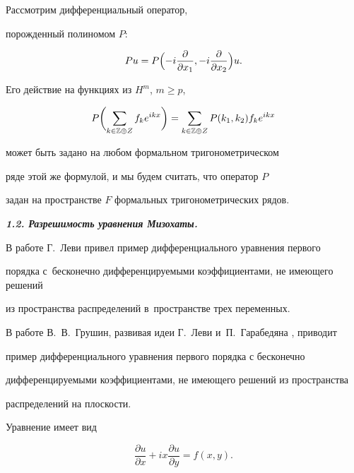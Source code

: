 Рассмотрим дифференциальный оператор,


порожденный полиномом $P$:

$$

P u = P \Bigl ( - i \frac

{\partial}{\partial x_1}, - i \frac {\partial}{\partial x_2} \Bigr ) u.

$$

Его  действие  на  функциях из  $H^m$, $ m\ge p$,  

$$ P\biggl(\sum_{k \in {\Bbb Z\oplus Z}} f_k e^{i k x}\biggr)=\sum_{k \in {\Bbb Z\oplus Z}} P(k_1,k_2)f_k e^{i k x}$$

может быть задано на любом формальном тригонометрическом

ряде этой же формулой, и мы будем считать, что оператор $P$

задан на пространстве $F$ формальных тригонометрических рядов.







\smallskip



{\bf \itshape 1.2. Разрешимость уравнения Мизохаты.}

В работе \cite{bur:7} Г.~Леви привел пример дифференциального уравнения первого

порядка с~бесконечно дифференцируемыми коэффициентами, не имеющего решений

из пространства распределений в~пространстве трех переменных.



В работе \cite{bur:8} В.~В.~Грушин, развивая идеи Г.~Леви и~П.~Гарабедяна \cite{bur:9}, приводит

пример дифференциального уравнения первого порядка с бесконечно

дифференцируемыми коэффициентами, не имеющего  решений  из  пространства

 распределений на плоскости. 

 Уравнение имеет вид

\begin{equation}

\frac {\partial u}{\partial x} + i x \frac {\partial u}{\partial y} =

f (x, y).

\label{bur(1.1)}

\end{equation}



